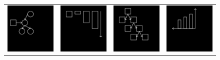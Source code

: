 \documentclass{article}
\begin{document}
\begin{figure}[h]
\begin{minipage}[t]{0.8\linewidth}
\begin{tabular}{llll}
  \includegraphics[width = \exampleImageSize]{figures/60.png}&
  \includegraphics[width = \exampleImageSize]{figures/5.png}&
    \includegraphics[width = \exampleImageSize]{figures/17.png}&
    \includegraphics[width = \exampleImageSize]{figures/58.png}

\end{tabular}
\end{minipage}
\end{figure}
\end{document}
